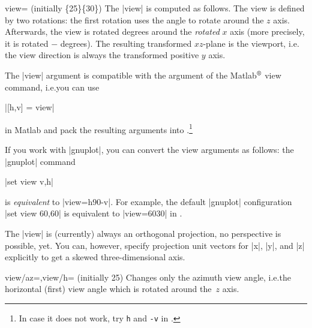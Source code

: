 {\begin{pgfplotskey}{view= (initially \{25\}\{30\})}
    The |view| is computed as follows. The view is defined by two rotations:
    the first rotation uses the  angle to rotate around the $z$
    axis. Afterwards, the view is rotated  degrees around the
    \emph{rotated} $x$ axis (more precisely, it is rotated $-$
    degrees). The resulting transformed $xz$-plane is the viewport, i.e.\@
    the view direction is always the transformed positive $y$ axis.

    The |view| argument is compatible with the argument of the
    Matlab$^\text{\textregistered}$ view command, i.e.\@ you can use

    |[h,v] = view|

    \noindent in Matlab and pack the resulting arguments into
    \PGFPlots.\footnote{In case it does not work, try \texttt{h} and \texttt{-v}
    in \PGFPlots{}.}

    If you work with |gnuplot|, you can convert the view arguments as follows:
    the |gnuplot| command

    |set view v,h|

    \noindent is \emph{equivalent} to |view={h}{90-v}|. For example, the
    default |gnuplot| configuration |set view 60,60| is equivalent to
    |view={60}{30}| in \PGFPlots{}.

    The |view| is (currently) always an orthogonal projection, no perspective
    is possible, yet. You can, however, specify projection unit vectors for
    |x|, |y|, and |z| explicitly to get a skewed three-dimensional axis.
\end{pgfplotskey}

\begin{pgfplotskeylist}{view/az=,view/h= (initially 25)}
    Changes only the azimuth view angle, i.e.\@ the horizontal (first) view
    angle which is rotated around the~$z$ axis.
\pgfplotsexpensiveexample
\begin{codeexample}[]
\end{codeexample}

\pgfplotsexpensiveexample
\begin{codeexample}[]
\end{codeexample}


\end{pgfplotskeylist}}
